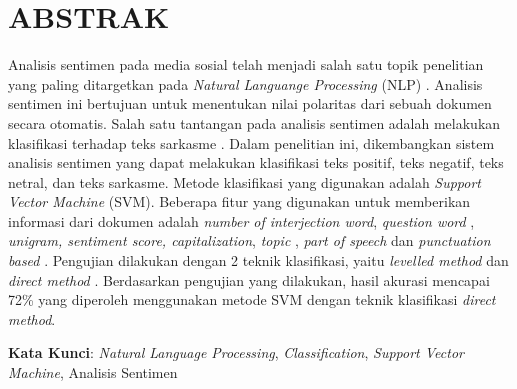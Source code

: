 \chapter*{ABSTRAK}

\noindent Analisis sentimen pada media sosial telah menjadi salah satu topik penelitian yang paling ditargetkan pada \textit{Natural Languange Processing} (NLP) \cite{2}. Analisis sentimen ini bertujuan untuk menentukan nilai polaritas dari sebuah dokumen secara otomatis. Salah satu tantangan pada analisis sentimen adalah melakukan klasifikasi terhadap teks sarkasme \cite{3}. Dalam penelitian ini, dikembangkan sistem analisis sentimen yang dapat melakukan klasifikasi teks positif, teks negatif, teks netral, dan teks sarkasme. Metode klasifikasi yang digunakan adalah \textit{Support Vector Machine} (SVM). Beberapa fitur yang digunakan untuk memberikan informasi dari dokumen adalah \textit{number of interjection word}, \textit{question word }\cite{5}, \textit{unigram, sentiment score,  capitalization}, \textit{topic} \cite{4}, \textit{part of speech} dan \textit{punctuation based} \cite{3}. Pengujian dilakukan dengan 2 teknik klasifikasi, yaitu \textit{levelled method} dan \textit{direct method} \cite{5}. Berdasarkan pengujian yang dilakukan, hasil akurasi mencapai 72\% yang diperoleh menggunakan metode SVM dengan teknik klasifikasi \textit{direct method}.

\noindent\textbf{Kata Kunci}: \textit{Natural Language Processing}, \textit{Classification}, \textit{Support Vector Machine}, Analisis Sentimen